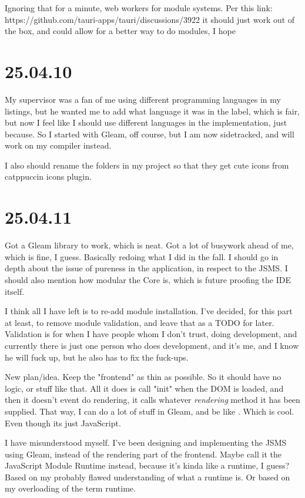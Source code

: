 Ignoring that for a minute, web workers for module systems. Per this link:
https://github.com/tauri-apps/tauri/discussions/3922
it should just work out of the box, and could allow for a better way to do
modules, I hope

\section{25.04.10}

My supervisor was a fan of me using different programming languages in my
listings, but he wanted me to add what language it was in the label, which is
fair, but now I feel like I should use different languages in the
implementation, just because. So I started with Gleam, off course, but I am now
sidetracked, and will work on my compiler instead.

I also should rename the folders in my project so that they get cute icons from
catppuccin icons plugin.

\section{25.04.11}

Got a Gleam library to work, which is neat. Got a lot of busywork ahead of me,
which is fine, I guess. Basically redoing what I did in the fall. I should go
in depth about the issue of pureness in the application, in respect to the JSMS.
I should also mention how modular the Core is, which is future proofing the IDE
itself.

I think all I have left is to re-add module installation. I've decided, for this
part at least, to remove module validation, and leave that as a TODO for later.
Validation is for when I have people whom I don't trust, doing development, and
currently there is just one person who does development, and it's me, and I know
he will fuck up, but he also has to fix the fuck-ups.

New plan/idea. Keep the "frontend" as thin as possible. So it should have no
logic, or stuff like that. All it does is call "init" when the DOM is loaded,
and then it doesn't event do rendering, it calls whatever \textit{rendering}
method it has been supplied. That way, I can do a lot of stuff in Gleam, and be
like . Which is
cool. Even though its just JavaScript.

I have misunderstood myself. I've been designing and implementing the JSMS using
Gleam, instead of the rendering part of the frontend. Maybe call it the
JavaScript Module Runtime instead, because it's kinda like a runtime, I guess?
Based on my probably flawed understanding of what a runtime is. Or based on my
overloading of the term runtime.